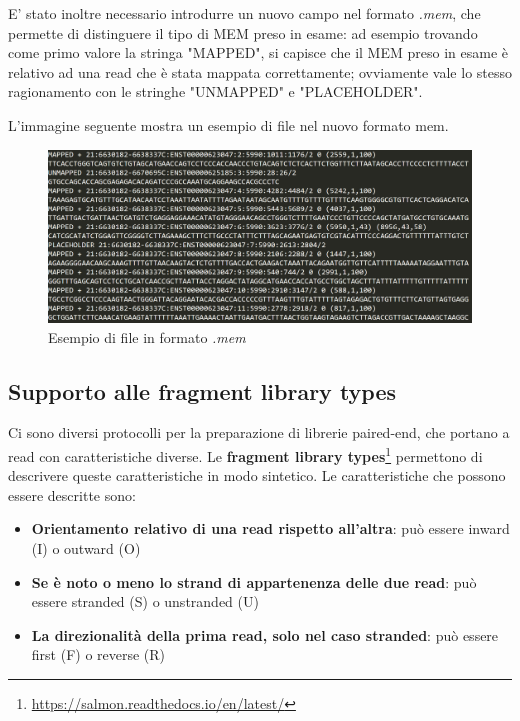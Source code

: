 E' stato inoltre necessario introdurre un nuovo campo nel formato \textit{.mem}, che permette di distinguere il tipo di MEM preso in esame: ad esempio trovando come primo valore la stringa "MAPPED", si capisce che il MEM preso in esame è relativo ad una read che è stata mappata correttamente; ovviamente vale lo stesso ragionamento con le stringhe "UNMAPPED" e "PLACEHOLDER".

L'immagine seguente mostra un esempio di file nel nuovo formato mem.

\begin{figure}[h!]
	\centering
	\includegraphics[width=\linewidth]{images/tipiMEM4.png}
  \caption{Esempio di file in formato \textit{.mem}}
  \label{fig:MEMTypes}
\end{figure}

\newpage

\subsection{Supporto alle fragment library types}
Ci sono diversi protocolli per la preparazione di librerie paired-end, che portano a read con caratteristiche diverse. Le \textbf{fragment library types}\footnote{\url{https://salmon.readthedocs.io/en/latest/}} permettono di descrivere queste caratteristiche in modo sintetico. Le caratteristiche che possono essere descritte sono:
\begin{itemize}
	\item \textbf{Orientamento relativo di una read rispetto all'altra}: può essere inward (I) o outward (O)
	\item \textbf{Se è noto o meno lo strand di appartenenza delle due read}:  può essere stranded (S) o unstranded (U)
	\item \textbf{La direzionalità della prima read, solo nel caso stranded}: può essere first (F) o reverse (R)
\end{itemize}

